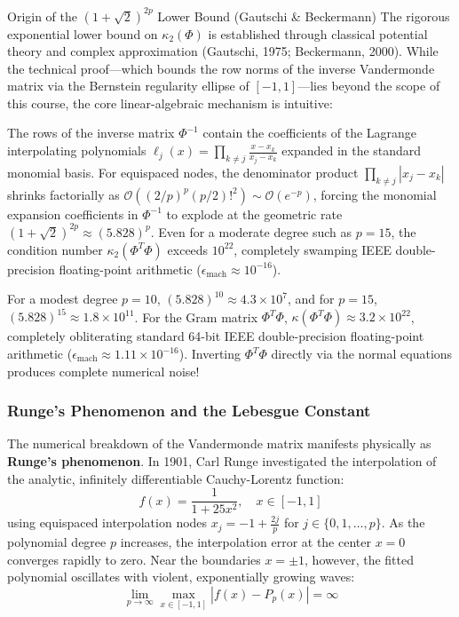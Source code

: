 \begin{intuitionbox}{Origin of the $(1+\sqrt{2})^{2p}$ Lower Bound (Gautschi \& Beckermann)}
The rigorous exponential lower bound on $\kappa_2(\Phi)$ is established through classical potential theory and complex approximation (Gautschi, 1975; Beckermann, 2000). While the technical proof—which bounds the row norms of the inverse Vandermonde matrix via the Bernstein regularity ellipse of $[-1, 1]$—lies beyond the scope of this course, the core linear-algebraic mechanism is intuitive:

The rows of the inverse matrix $\Phi^{-1}$ contain the coefficients of the Lagrange interpolating polynomials $\ell_j(x) = \prod_{k \ne j} \frac{x - x_k}{x_j - x_k}$ expanded in the standard monomial basis. For equispaced nodes, the denominator product $\prod_{k \ne j} |x_j - x_k|$ shrinks factorially as $\mathcal{O}((2/p)^p (p/2)!^2) \sim \mathcal{O}(e^{-p})$, forcing the monomial expansion coefficients in $\Phi^{-1}$ to explode at the geometric rate $(1 + \sqrt{2})^{2p} \approx (5.828)^p$. Even for a moderate degree such as $p = 15$, the condition number $\kappa_2(\Phi^T \Phi)$ exceeds $10^{22}$, completely swamping IEEE double-precision floating-point arithmetic ($\epsilon_{\text{mach}} \approx 10^{-16}$).
\end{intuitionbox}

For a modest degree $p = 10$, $(5.828)^{10} \approx 4.3 \times 10^7$, and for $p = 15$, $(5.828)^{15} \approx 1.8 \times 10^{11}$. For the Gram matrix $\Phi^T \Phi$, $\kappa(\Phi^T \Phi) \approx 3.2 \times 10^{22}$, completely obliterating standard 64-bit IEEE double-precision floating-point arithmetic ($\epsilon_{\text{mach}} \approx 1.11 \times 10^{-16}$). Inverting $\Phi^T \Phi$ directly via the normal equations produces complete numerical noise!

\subsubsection{Runge's Phenomenon and the Lebesgue Constant}
The numerical breakdown of the Vandermonde matrix manifests physically as \textbf{Runge's phenomenon}. In 1901, Carl Runge investigated the interpolation of the analytic, infinitely differentiable Cauchy-Lorentz function:
\begin{equation}
f(x) = \frac{1}{1 + 25 x^2}, \quad x \in [-1, 1]
\label{eq:runge_function}
\end{equation}
using equispaced interpolation nodes $x_j = -1 + \frac{2j}{p}$ for $j \in \{0, 1, \dots, p\}$.
As the polynomial degree $p$ increases, the interpolation error at the center $x = 0$ converges rapidly to zero. Near the boundaries $x = \pm 1$, however, the fitted polynomial oscillates with violent, exponentially growing waves:
\begin{equation}
\lim_{p \to \infty} \max_{x \in [-1, 1]} |f(x) - P_p(x)| = \infty
\end{equation}

